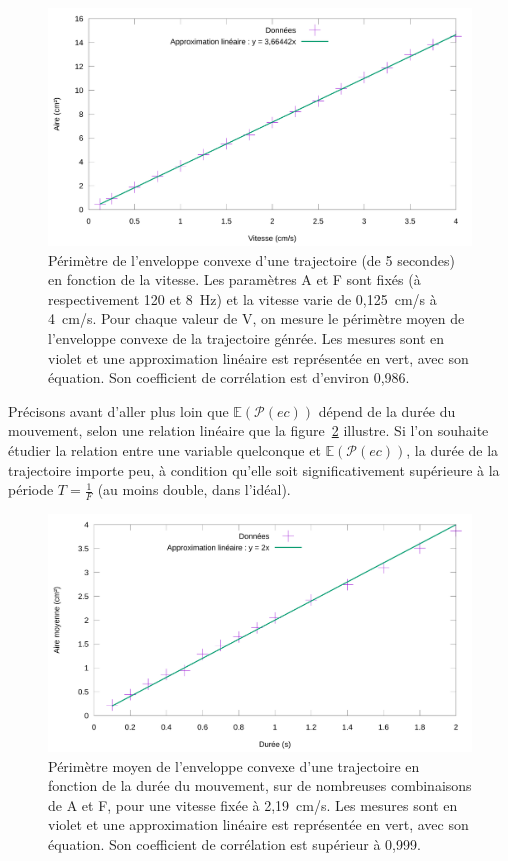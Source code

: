 	\begin{figure}[!htb]
		\centering
		\includegraphics[width=\textwidth]{figures/ch4/areaVspeed}
		\caption[Périmètre de l'enveloppe convexe en fonction de la vitesse]{Périmètre de l'enveloppe convexe d'une trajectoire (de 5 secondes) en fonction de la vitesse. Les paramètres A et F sont fixés (à respectivement 120\textdegree{} et 8~Hz) et la vitesse varie de 0,125~cm/s à 4~cm/s. Pour chaque valeur de V, on mesure le périmètre moyen de l'enveloppe convexe de la trajectoire génrée. Les mesures sont en violet et une approximation linéaire est représentée en vert, avec son équation. Son coefficient de corrélation est d'environ 0,986.}
		\label{fig:avspeed}
	\end{figure}
	
	Précisons avant d'aller plus loin que $\mathbb{E}(\mathcal{P}(ec))$ dépend de la durée du mouvement, selon une relation linéaire que la figure~\ref{fig:durationVarea} illustre. Si l'on souhaite étudier la relation entre une variable quelconque et $\mathbb{E}(\mathcal{P}(ec))$, la durée de la trajectoire importe peu, à condition qu'elle soit significativement supérieure à la période $T = \frac{1}{F}$ (au moins double, dans l'idéal).
	
	\begin{figure}[!htb]
		\centering
		\includegraphics[width=\textwidth]{figures/ch4/durationVarea}
		\caption[Périmètre de l'enveloppe convexe sur en fonction de la durée du mouvement]{Périmètre moyen de l'enveloppe convexe d'une trajectoire en fonction de la durée du mouvement, sur de nombreuses combinaisons de A et F, pour une vitesse fixée à 2,19~cm/s. Les mesures sont en violet et une approximation linéaire est représentée en vert, avec son équation. Son coefficient de corrélation est supérieur à 0,999.}
		\label{fig:durationVarea}
	\end{figure}
	
